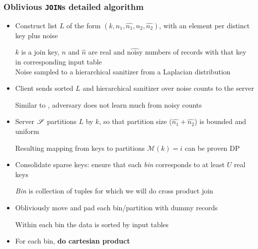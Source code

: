 	\begin{frame}[label={frame:appendix:joins-detailed}]

		\frametitle{Oblivious \texttt{JOIN}s detailed algorithm}

		\begin{itemize}
			\item<1->
				Construct list $L$ of the form $(k, n_1, \hat{n_1}, n_2, \hat{n_2})$, with an element per distinct key plus noise \\
				\begin{small}
					$k$ is a join key, $n$ and $\hat{n}$ are real and $\widehat{\text{noisy}}$ numbers of records with that key in corresponding input table \\
					Noise sampled to a hierarchical sanitizer from a Laplacian distribution
				\end{small}

			\item<2->
				Client \user{} sends sorted $L$ and hierarchical sanitizer over noise counts to the server \server{} \\
				\begin{small}
					Similar to \epsolute{}, adversary does not learn much from noisy counts
				\end{small}

			\item<3->
				Server $\mathscr{S}{}$ partitions $L$ by $k$, so that partition size ($\hat{n_1} + \hat{n_2}$) is bounded and uniform \\
				\begin{small}
					Resulting mapping from keys to partitions $\mathcal{M}(k) = i$ can be proven DP
				\end{small}

			\item<4->
				Consolidate sparse keys: ensure that each \emph{bin} corresponds to at least $U$ real keys \\
				\begin{small}
					\emph{Bin} is collection of tuples for which we will do cross product join
				\end{small}

			\item<5->
				Obliviously move and pad each bin/partition with dummy records \\
				\begin{small}
					Within each bin the data is sorted by input tables
				\end{small}

			\item<6->
				For each bin, \textbf{do cartesian product}

		\end{itemize}

		\hyperlink{frame:oblivious-joins}{}

	\end{frame}

